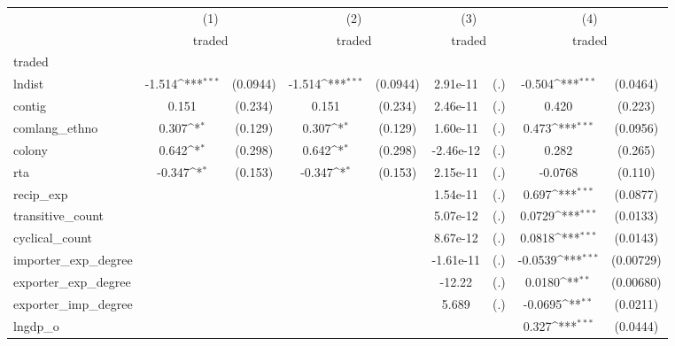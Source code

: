 {
\def\sym#1{\ifmmode^{#1}\else\(^{#1}\)\fi}
\begin{tabular}{l*{4}{cc}}
\hline\hline
          &\multicolumn{2}{c}{(1)}     &\multicolumn{2}{c}{(2)}     &\multicolumn{2}{c}{(3)}     &\multicolumn{2}{c}{(4)}     \\
          &\multicolumn{2}{c}{traded}  &\multicolumn{2}{c}{traded}  &\multicolumn{2}{c}{traded}  &\multicolumn{2}{c}{traded}  \\
\hline
traded    &                  &         &                  &         &                  &         &                  &         \\
lndist    &   -1.514\sym{***}& (0.0944)&   -1.514\sym{***}& (0.0944)& 2.91e-11         &      (.)&   -0.504\sym{***}& (0.0464)\\
contig    &    0.151         &  (0.234)&    0.151         &  (0.234)& 2.46e-11         &      (.)&    0.420         &  (0.223)\\
comlang\_ethno&    0.307\sym{*}  &  (0.129)&    0.307\sym{*}  &  (0.129)& 1.60e-11         &      (.)&    0.473\sym{***}& (0.0956)\\
colony    &    0.642\sym{*}  &  (0.298)&    0.642\sym{*}  &  (0.298)&-2.46e-12         &      (.)&    0.282         &  (0.265)\\
rta       &   -0.347\sym{*}  &  (0.153)&   -0.347\sym{*}  &  (0.153)& 2.15e-11         &      (.)&  -0.0768         &  (0.110)\\
recip\_exp &                  &         &                  &         & 1.54e-11         &      (.)&    0.697\sym{***}& (0.0877)\\
transitive\_count&                  &         &                  &         & 5.07e-12         &      (.)&   0.0729\sym{***}& (0.0133)\\
cyclical\_count&                  &         &                  &         & 8.67e-12         &      (.)&   0.0818\sym{***}& (0.0143)\\
importer\_exp\_degree&                  &         &                  &         &-1.61e-11         &      (.)&  -0.0539\sym{***}&(0.00729)\\
exporter\_exp\_degree&                  &         &                  &         &   -12.22         &      (.)&   0.0180\sym{**} &(0.00680)\\
exporter\_imp\_degree&                  &         &                  &         &    5.689         &      (.)&  -0.0695\sym{**} & (0.0211)\\
lngdp\_o   &                  &         &                  &         &                  &         &    0.327\sym{***}& (0.0444)\\

\end{tabular}}
